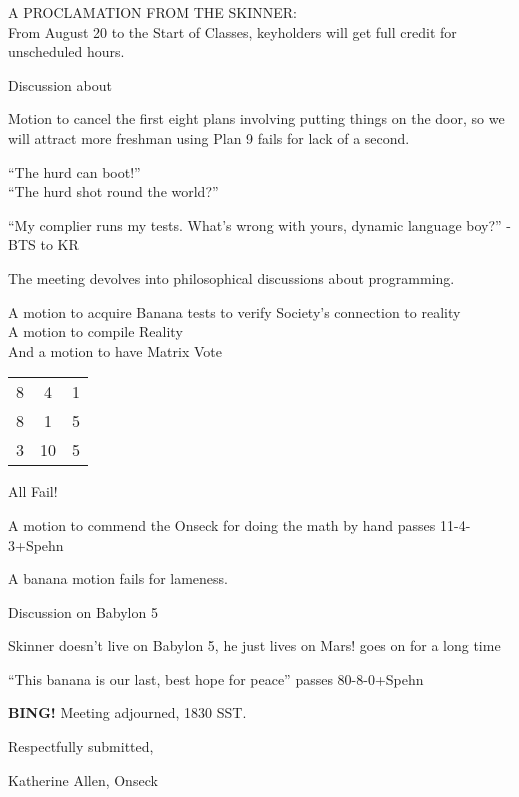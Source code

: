 \documentclass[10pt]{article}
\newcommand{\bing}{{\bf BING!} }
\begin{document}
A PROCLAMATION FROM THE SKINNER:\\
From August 20 to the Start of Classes, keyholders will get full
credit for unscheduled hours.

Discussion about 

Motion to cancel the first eight plans involving putting things on the
door, so we will attract more freshman using Plan 9 fails for lack of
a second.

``The hurd can boot!''\\
``The hurd shot round the world?''

``My complier runs my tests. What's wrong with yours, dynamic language
boy?'' -BTS to KR

The meeting devolves into philosophical discussions about programming.

A motion to acquire Banana tests to verify Society's connection to reality\\
A motion to compile Reality\\
And a motion to have Matrix Vote\\
\begin{tabular}{c|c|c}
8&4&1\\
8&1&5\\
3&10&5\\
\end{tabular}
All Fail!

A motion to commend the Onseck for doing the math by hand passes
11-4-3+Spehn

A banana motion fails for lameness.

Discussion on Babylon 5 

Skinner doesn't live on Babylon 5, he just lives on Mars! goes on for
a long time

``This banana is our last, best hope for peace''  passes 80-8-0+Spehn

\bing
\noindent
Meeting adjourned, 1830 SST.

\vspace{18pt}

\centerline{Respectfully submitted,}
\centerline{Katherine Allen, Onseck}
\end{document}

